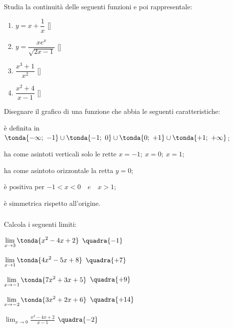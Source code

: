 \begin{esercizio}\label{ese:03.1}
Studia la continuità delle seguenti funzioni e poi rappresentale:
\begin{multicols}{2}
 \begin{enumerate} [label=\alph*]
  \item \(y = x+\dfrac{1}{x}\) \hfill [\(\)]
  \item \(y = \dfrac{xe^x}{\sqrt{2x-1}}\) \hfill [\(\)]
  \item \(\dfrac{x^3+1}{x^2}\) \hfill [\(\)]
  \item \(\dfrac{x^2+4}{x-1}\) \hfill [\(\)]
 \end{enumerate}
\end{multicols}
\end{esercizio}

\begin{esercizio}\label{ese:03.1}
Disegnare il grafico di una funzione che abbia le seguenti caratteristiche:
 \begin{enumeratea}
  \item è definita in \(\tonda{-\infty;~-1} \cup \tonda{-1;~0} \cup 
                        \tonda{0;~+1} \cup \tonda{+1;~+\infty}\);
  \item ha come asintoti verticali solo le rette \(x= -1;~x=0;~x=1\);
  \item ha come asintoto orizzontale la retta \(y=0\);
  \item è positiva per \(-1<x<0 \quad e \quad x>1\);
  \item è simmetrica rispetto all’origine.
 \end{enumeratea}
\end{esercizio}

\subsubsection*{}

\begin{esercizio}\label{ese:03.1}
Calcola i seguenti limiti:
\begin{multicols}{2}
 \begin{enumeratea}
  \item \(\displaystyle \lim_{x \rightarrow 3} \tonda{x^2-4x+2}\)
  \hfill \(\quadra{-1}\)
  \item \(\displaystyle \lim_{x \rightarrow 1} \tonda{4x^2-5x+8}\)
  \hfill \(\quadra{+7}\)
  \item \(\displaystyle \lim_{x \rightarrow -1} \tonda{7x^2+3x+5}\)
  \hfill \(\quadra{+9}\)
  \item \(\displaystyle \lim_{x \rightarrow -2} \tonda{3x^2+2x+6}\)
  \hfill \(\quadra{+14}\)
  \item \(\displaystyle \lim_{x \rightarrow 0} \frac{x^2-4x+2}{x-1}\)
  \hfill \(\quadra{-2}\)
 \end{enumeratea}
 \end{multicols}
\end{esercizio}


